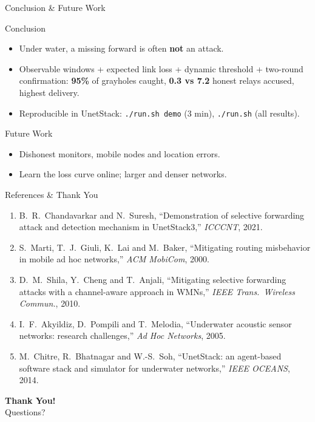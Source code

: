 \documentclass[aspectratio=169,11pt]{beamer}
\begin{document}
\begin{frame}{Conclusion \& Future Work}
  \begin{block}{Conclusion}
    \begin{itemize}
      \item Under water, a missing forward is often \textbf{not} an attack.
      \item Observable windows + expected link loss + dynamic threshold + two-round confirmation: \textbf{95\%} of grayholes caught, \textbf{0.3 vs 7.2} honest relays accused, highest delivery.
      \item Reproducible in UnetStack: \texttt{./run.sh demo} (3 min), \texttt{./run.sh} (all results).
    \end{itemize}
  \end{block}
  \begin{block}{Future Work}
    \begin{itemize}
      \item Dishonest monitors, mobile nodes and location errors.
      \item Learn the loss curve online; larger and denser networks.
    \end{itemize}
  \end{block}
\end{frame}

\begin{frame}{References \& Thank You}
  \footnotesize
  \begin{enumerate}
    \item B.\ R.\ Chandavarkar and N.\ Suresh, ``Demonstration of selective forwarding attack and detection mechanism in UnetStack3,'' \textit{ICCCNT}, 2021.
    \item S.\ Marti, T.\ J.\ Giuli, K.\ Lai and M.\ Baker, ``Mitigating routing misbehavior in mobile ad hoc networks,'' \textit{ACM MobiCom}, 2000.
    \item D.\ M.\ Shila, Y.\ Cheng and T.\ Anjali, ``Mitigating selective forwarding attacks with a channel-aware approach in WMNs,'' \textit{IEEE Trans.\ Wireless Commun.}, 2010.
    \item I.\ F.\ Akyildiz, D.\ Pompili and T.\ Melodia, ``Underwater acoustic sensor networks: research challenges,'' \textit{Ad Hoc Networks}, 2005.
    \item M.\ Chitre, R.\ Bhatnagar and W.-S.\ Soh, ``UnetStack: an agent-based software stack and simulator for underwater networks,'' \textit{IEEE OCEANS}, 2014.
  \end{enumerate}
  \vspace{1em}
  \centering
  {\Large\bfseries Thank You!}\\[0.3em]
  {\normalsize Questions?}
\end{frame}
\end{document}

